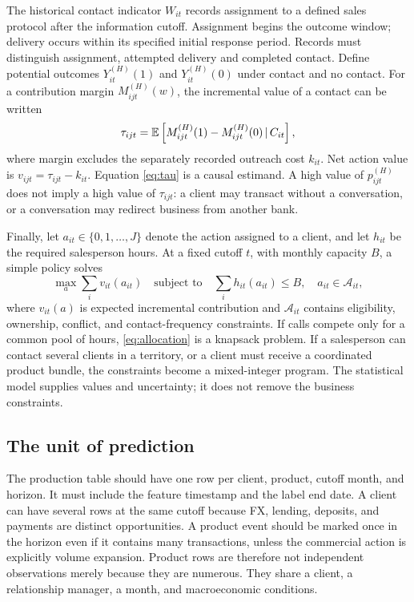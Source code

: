 The historical contact indicator $W_{it}$ records assignment to a defined sales protocol after the information cutoff. Assignment begins the outcome window; delivery occurs within its specified initial response period. Records must distinguish assignment, attempted delivery and completed contact. Define potential outcomes $Y_{it}^{(H)}(1)$ and $Y_{it}^{(H)}(0)$ under contact and no contact. For a contribution margin $M_{ijt}^{(H)}(w)$, the incremental value of a contact can be written
\begin{equation}
 \tau_{ijt}=\mathbb{E}\left[M_{ijt}^{(H)}(1)-M_{ijt}^{(H)}(0)\,|\, C_{it}\right],
 \label{eq:tau}
\end{equation}
 where margin excludes the separately recorded outreach cost $k_{it}$. Net action value is $v_{ijt}=\tau_{ijt}-k_{it}$. Equation \eqref{eq:tau} is a causal estimand. A high value of $p_{ijt}^{(H)}$ does not imply a high value of $\tau_{ijt}$: a client may transact without a conversation, or a conversation may redirect business from another bank.

Finally, let $a_{it}\in\{0,1,\ldots,J\}$ denote the action assigned to a client, and let $h_{it}$ be the required salesperson hours. At a fixed cutoff $t$, with monthly capacity $B$, a simple policy solves
\begin{equation}
 \max_{a}\sum_i v_{it}(a_{it})
 \quad\text{subject to}\quad
 \sum_i h_{it}(a_{it})\le B,
 \quad a_{it}\in\mathcal A_{it},
 \label{eq:allocation}
\end{equation}
 where $v_{it}(a)$ is expected incremental contribution and $\mathcal A_{it}$ contains eligibility, ownership, conflict, and contact-frequency constraints. If calls compete only for a common pool of hours, \eqref{eq:allocation} is a knapsack problem. If a salesperson can contact several clients in a territory, or a client must receive a coordinated product bundle, the constraints become a mixed-integer program. The statistical model supplies values and uncertainty; it does not remove the business constraints.

\subsection{The unit of prediction}

The production table should have one row per client, product, cutoff month, and horizon. It must include the feature timestamp and the label end date. A client can have several rows at the same cutoff because FX, lending, deposits, and payments are distinct opportunities. A product event should be marked once in the horizon even if it contains many transactions, unless the commercial action is explicitly volume expansion. Product rows are therefore not independent observations merely because they are numerous. They share a client, a relationship manager, a month, and macroeconomic conditions.

